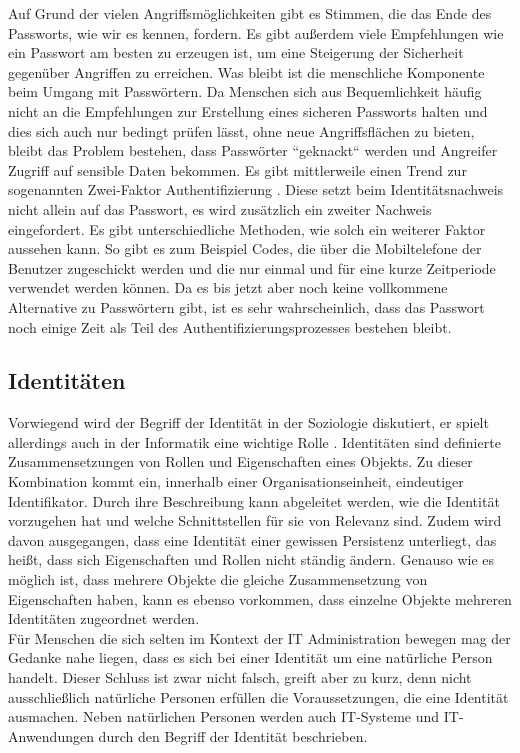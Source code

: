 \documentclass[
book,
a4paper,   
titlepage,  
halfparskip,
12pt        
]{scrartcl}
\begin{document}
\begin{onehalfspacing}
Auf Grund der vielen Angriffsmöglichkeiten gibt es Stimmen, die das Ende des Passworts, wie wir es kennen, fordern\cite{passw}. Es gibt außerdem viele Empfehlungen wie ein Passwort am besten zu erzeugen ist, um eine Steigerung der Sicherheit gegenüber Angriffen zu erreichen\cite[S. 11]{passwo}. Was bleibt ist die menschliche Komponente beim Umgang mit Passwörtern. Da Menschen sich aus Bequemlichkeit häufig nicht an die Empfehlungen zur Erstellung eines sicheren Passworts halten und dies sich auch nur bedingt prüfen lässt, ohne neue Angriffsflächen zu bieten, bleibt das Problem bestehen, dass Passwörter ``geknackt`` werden und Angreifer Zugriff auf sensible Daten bekommen. Es gibt mittlerweile einen Trend zur sogenannten Zwei-Faktor Authentifizierung \cite{passw}. Diese setzt beim Identitätsnachweis nicht allein auf das Passwort, es wird zusätzlich ein zweiter Nachweis eingefordert. Es gibt unterschiedliche Methoden, wie solch ein weiterer Faktor aussehen kann. So gibt es zum Beispiel Codes, die über die Mobiltelefone der Benutzer zugeschickt werden und die nur einmal und für eine kurze Zeitperiode verwendet werden können. Da es bis jetzt aber noch keine vollkommene Alternative zu Passwörtern gibt, ist es sehr wahrscheinlich, dass das Passwort noch einige Zeit als Teil des Authentifizierungsprozesses bestehen bleibt.\cite{pass}

\subsection{Identitäten}
\label{subsec:ident}
Vorwiegend wird der Begriff der Identität in der Soziologie diskutiert, er spielt allerdings auch in der Informatik eine wichtige Rolle \cite[S. 21]{kerberos2}. Identitäten sind definierte Zusammensetzungen von Rollen und Eigenschaften eines Objekts. Zu dieser Kombination kommt ein, innerhalb einer Organisationseinheit, eindeutiger Identifikator. Durch ihre Beschreibung kann abgeleitet werden, wie die Identität vorzugehen hat und welche Schnittstellen für sie von Relevanz sind. Zudem wird davon ausgegangen, dass eine Identität einer gewissen Persistenz unterliegt, das heißt, dass sich Eigenschaften und Rollen nicht ständig ändern. Genauso wie es möglich ist, dass mehrere Objekte die gleiche Zusammensetzung von Eigenschaften haben, kann es ebenso vorkommen, dass einzelne Objekte mehreren Identitäten zugeordnet werden.\\
Für Menschen die sich selten im Kontext der \ac{IT} Administration bewegen mag der Gedanke nahe liegen, dass es sich bei einer Identität um eine natürliche Person handelt. Dieser Schluss ist zwar nicht falsch, greift aber zu kurz, denn nicht ausschließlich natürliche Personen erfüllen die Voraussetzungen, die eine Identität ausmachen. Neben natürlichen Personen werden auch \ac{IT}-Systeme und \ac{IT}-Anwendungen durch den Begriff der Identität beschrieben.\cite[S. 21ff]{kerberos2}


\end{onehalfspacing}
\end{document}

